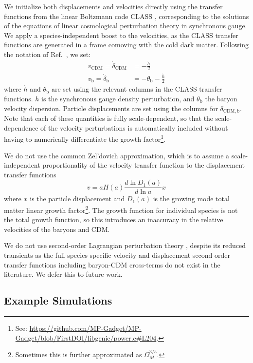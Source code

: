 \documentclass[a4paper,11pt]{article}
\begin{document}
We initialize both displacements and velocities directly using the transfer functions from the linear Boltzmann code CLASS \cite{CLASS}, corresponding to the solutions of the equations of linear cosmological perturbation theory in synchronous gauge. We apply a species-independent boost to the velocities, as the CLASS transfer functions are generated in a frame comoving with the cold dark matter. Following the notation of Ref.~\cite{Ma:1995}, we set:
\begin{align}
 v_\mathrm{CDM} = \dot{\delta}_\mathrm{CDM}  &= - \frac{\dot{h}}{2} \\
 v_\mathrm{b} = \dot{\delta}_\mathrm{b}  &= - \theta_\mathrm{b} - \frac{\dot{h}}{2}
\end{align}
where $\dot{h}$ and $\theta_\mathrm{b}$ are set using the relevant columns in the CLASS transfer functions. $h$ is the synchronous gauge density perturbation, and $\theta_\mathrm{b}$ the baryon velocity dispersion.
Particle displacements are set using the columns for $\delta_\mathrm{CDM, b}$. Note that each of these quantities is fully scale-dependent, so that the scale-dependence of the velocity perturbations is automatically included without having to numerically differentiate the growth factor\footnote{See: \protect\url{https://github.com/MP-Gadget/MP-Gadget/blob/FirstDOI/libgenic/power.c\#L204}.}.

We do not use the common Zel'dovich approximation, which is to assume a scale-independent proportionality of the velocity transfer function to the displacement transfer functions
\begin{equation*}
 v = a H(a) \frac{d \ln D_1(a)}{d \ln a} x
\end{equation*}
where $x$ is the particle displacement and $D_1(a)$ is the growing mode total matter linear growth factor\footnote{Sometimes this is further approximated as $\Omega_M^{3/5}$.}. The growth function for individual species is not the total growth function, so this introduces an inaccuracy in the relative velocities of the baryons and CDM.

We do not use second-order Lagrangian perturbation theory \cite{Scoccimarro:1998}, despite its reduced transients as the full species specific velocity and displacement second order transfer functions including baryon-CDM cross-terms do not exist in the literature. We defer this to future work.

\subsection{Example Simulations}
\label{sec:simulations}
\end{document}
